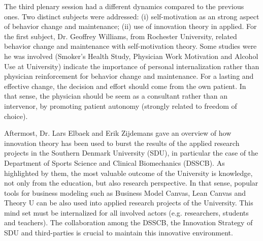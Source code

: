 The third plenary session had a different dynamics compared to the previous ones. 
Two distinct subjects were addressed: (i) self-motivation as an strong aspect of behavior change and maintenance; (ii) use of innovation theory in applied. 
For the first subject, Dr. Geoffrey Williams, from Rochester University, related behavior change and maintenance with self-motivation theory. 
Some studies were he was involved (Smoker’s Health Study, Physician Work Motivation and Alcohol Use at University) indicate the importance of personal internalization rather than physician reinforcement for behavior change and maintenance.
For a lasting and effective change, the decision and effort should come from the own patient. 
In that sense, the physician should be seem as a consultant rather than an intervenor, by promoting patient autonomy (strongly related to freedom of choice).

Aftermost, Dr. Lars Elbaek and Erik Zijdemans gave an overview of how innovation theory has been used to burst the results of the applied research projects in the Southern Denmark University (SDU), in particular the case of the Department of Sports Science and Clinical Biomechanics (DSSCB). 
As highlighted by them, the most valuable outcome of the University is knowledge, not only from the education, but also research perspective.
In that sense, popular tools for business modeling such as Business Model Canvas, Lean Canvas and Theory U can be also used into applied research projects of the University.
This mind set must be internalized for all involved actors (e.g. researchers, students and teachers). 
The collaboration among the DSSCB, the Innovation Strategy of SDU and third-parties is crucial to maintain this innovative environment.




